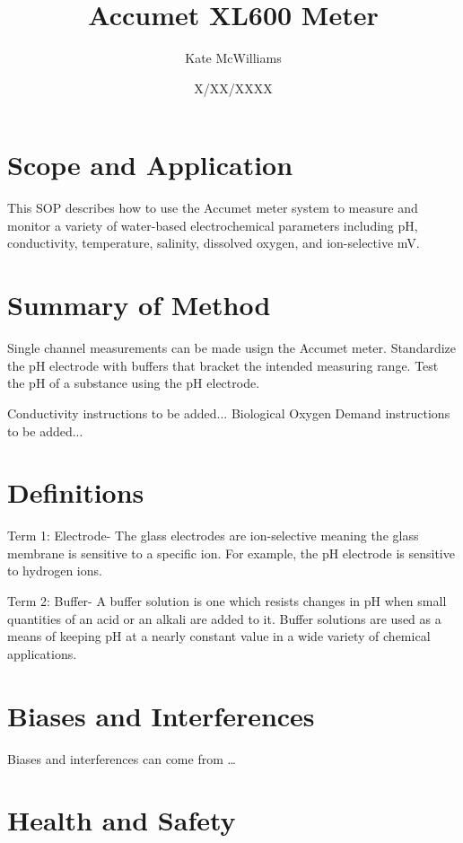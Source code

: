 \documentclass[12pt]{../SOP3_beta}\usepackage[]{graphicx}\usepackage[]{color}
\title{Accumet XL600 Meter}
\date{X/XX/XXXX}
\author{Kate McWilliams}
\begin{document}
\maketitle

\section{Scope and Application}

\NP This SOP describes how to use the Accumet meter system to measure and monitor a variety of water-based electrochemical parameters including pH, conductivity, temperature, salinity, dissolved oxygen, and ion-selective mV.

\section{Summary of Method}

\NP Single channel measurements can be made usign the Accumet meter. Standardize the pH electrode with buffers that bracket the intended measuring range. Test the pH of a substance using the pH electrode.

\NP Conductivity instructions to be added...
\NP Biological Oxygen Demand instructions to be added...

\tableofcontents

\newpage

\section{Definitions}

\NP Term 1: Electrode- The glass electrodes are ion-selective meaning the glass membrane is sensitive to a specific ion. For example, the pH electrode is sensitive to hydrogen ions. 

\NP Term 2: Buffer- A buffer solution is one which resists changes in pH when small quantities of an acid or an alkali are added to it. Buffer solutions are used as a means of keeping pH at a nearly constant value in a wide variety of chemical applications. 

\section{Biases and Interferences}

\NP Biases and interferences can come from \dots

\section{Health and Safety}
\end{document}
